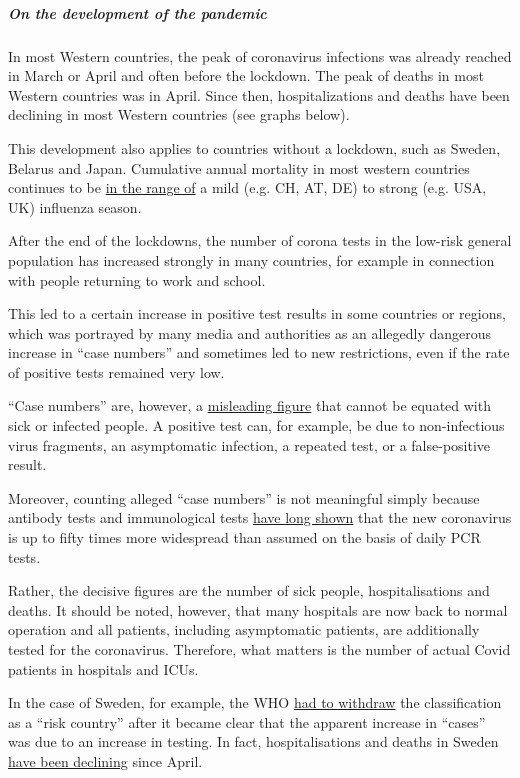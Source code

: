 \hypertarget{on-the-development-of-the-pandemic}{%
\subparagraph{\texorpdfstring{\textbf{On the development of the
pandemic}}{On the development of the pandemic}}\label{on-the-development-of-the-pandemic}}

In most Western countries, the peak of coronavirus infections was
already reached in March or April and often before the lockdown. The
peak of deaths in most Western countries was in April. Since then,
hospitalizations and deaths have been declining in most Western
countries (see graphs below).

This development also applies to countries without a lockdown, such as
Sweden, Belarus and Japan. Cumulative annual mortality in most western
countries continues to be
\href{https://swprs.org/studies-on-covid-19-lethality/\#overall-mortality}{in
the range of} a mild (e.g. CH, AT, DE) to strong (e.g. USA, UK)
influenza season.

After the end of the lockdowns, the number of corona tests in the
low-risk general population has increased strongly in many countries,
for example in connection with people returning to work and school.

This led to a certain increase in positive test results in some
countries or regions, which was portrayed by many media and authorities
as an allegedly dangerous increase in ``case numbers'' and sometimes led
to new restrictions, even if the rate of positive tests remained very
low.

``Case numbers'' are, however, a
\href{https://swprs.org/corona-media-propaganda/}{misleading figure}
that cannot be equated with sick or infected people. A positive test
can, for example, be due to non-infectious virus fragments, an
asymptomatic infection, a repeated test, or a false-positive result.

Moreover, counting alleged ``case numbers'' is not meaningful simply
because antibody tests and immunological tests
\href{https://swprs.org/studies-on-covid-19-lethality/}{have long shown}
that the new coronavirus is up to fifty times more widespread than
assumed on the basis of daily PCR tests.

Rather, the decisive figures are the number of sick people,
hospitalisations and deaths. It should be noted, however, that many
hospitals are now back to normal operation and all patients, including
asymptomatic patients, are additionally tested for the coronavirus.
Therefore, what matters is the number of actual Covid patients in
hospitals and ICUs.

In the case of Sweden, for example, the WHO
\href{https://www.bloomberg.com/news/articles/2020-06-28/sweden-s-covid-expert-says-the-world-still-doesn-t-understand}{had
to withdraw} the classification as a ``risk country'' after it became
clear that the apparent increase in ``cases'' was due to an increase in
testing. In fact, hospitalisations and deaths in Sweden
\href{https://swprs.files.wordpress.com/2020/07/sweden-icu-deaths-june-28.png}{have
been declining} since April.


